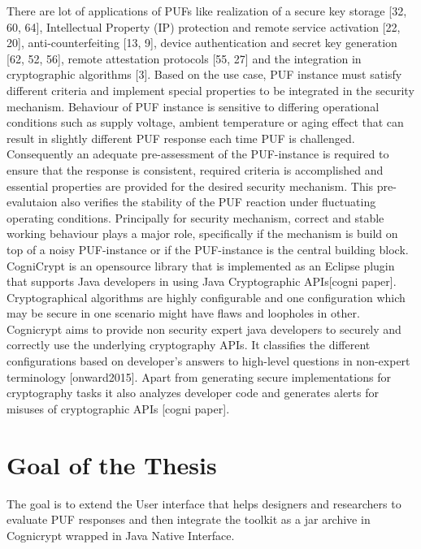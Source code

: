 There are lot of applications of PUFs like realization of a secure key storage [32, 60, 64], Intellectual Property (IP) protection and remote service activation [22, 20], anti-counterfeiting [13, 9], device authentication and secret key generation [62, 52, 56], remote attestation protocols [55, 27] and the integration in cryptographic algorithms [3]. Based on the use case, PUF instance must satisfy different criteria and implement special properties to be integrated in the security mechanism. 
Behaviour of PUF instance is sensitive to differing operational conditions such as supply voltage, ambient temperature or aging effect that can result in slightly different PUF response each time PUF is challenged. \pagebreak Consequently an adequate pre-assessment of the PUF-instance is required to ensure that the response is consistent, required criteria is accomplished and essential properties are provided for the desired security mechanism. This pre-evalutaion also verifies the stability of the PUF reaction under fluctuating operating conditions. Principally for security mechanism, correct and stable working behaviour plays a major role, specifically if the mechanism is build on top of a noisy PUF-instance or if the PUF-instance is the central building block.\\

CogniCrypt is an opensource library that is implemented as an Eclipse plugin that supports Java developers in using Java Cryptographic APIs[cogni paper]. Cryptographical algorithms are highly configurable and one configuration which may be secure in one scenario might have flaws and loopholes in other. Cognicrypt aims to provide non security expert java developers to securely and correctly use the underlying cryptography APIs. 
It classifies the different configurations based on developer's answers to high-level questions in non-expert terminology [onward2015]. Apart from generating secure implementations for cryptography tasks it also analyzes developer code and generates alerts for misuses of cryptographic APIs [cogni paper]. 


\section{Goal of the Thesis}
The goal is to extend the User interface that helps designers and researchers to evaluate PUF responses  and then integrate the toolkit as a jar archive in Cognicrypt wrapped in Java Native Interface.

